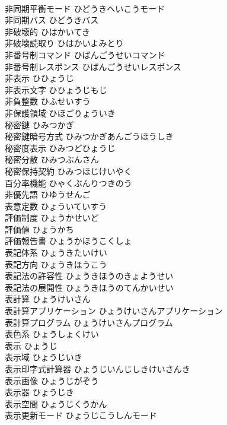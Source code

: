 \documentclass[8pt]{extreport}
\begin{document}
\begin{CJK}{UTF8}{min}
\\	非同期平衡モード	ひどうきへいこうモード	
\\	非同期バス	ひどうきバス	
\\	非破壊的	ひはかいてき	
\\	非破壊読取り	ひはかいよみとり	
\\	非番号制コマンド	ひばんごうせいコマンド	
\\	非番号制レスポンス	ひばんごうせいレスポンス	
\\	非表示	ひひょうじ	
\\	非表示文字	ひひょうじもじ	
\\	非負整数	ひふせいすう	
\\	非保護領域	ひほごりょういき	
\\	秘密鍵	ひみつかぎ	
\\	秘密鍵暗号方式	ひみつかぎあんごうほうしき	
\\	秘密度表示	ひみつどひょうじ	
\\	秘密分散	ひみつぶんさん	
\\	秘密保持契約	ひみつほじけいやく	
\\	百分率機能	ひゃくぶんりつきのう	
\\	非優先語	ひゆうせんご	
\\	表意定数	ひょういていすう	
\\	評価制度	ひょうかせいど	
\\	評価値	ひょうかち	
\\	評価報告書	ひょうかほうこくしょ	
\\	表記体系	ひょうきたいけい	
\\	表記方向	ひょうきほうこう	
\\	表記法の許容性	ひょうきほうのきょようせい	
\\	表記法の展開性	ひょうきほうのてんかいせい	
\\	表計算	ひょうけいさん	
\\	表計算アプリケーション	ひょうけいさんアプリケーション	
\\	表計算プログラム	ひょうけいさんプログラム	
\\	表色系	ひょうしょくけい	
\\	表示	ひょうじ	
\\	表示域	ひょうじいき	
\\	表示印字式計算器	ひょうじいんじしきけいさんき	
\\	表示画像	ひょうじがぞう	
\\	表示器	ひょうじき	
\\	表示空間	ひょうじくうかん	
\\	表示更新モード	ひょうじこうしんモード	

\end{CJK}
\end{document}
